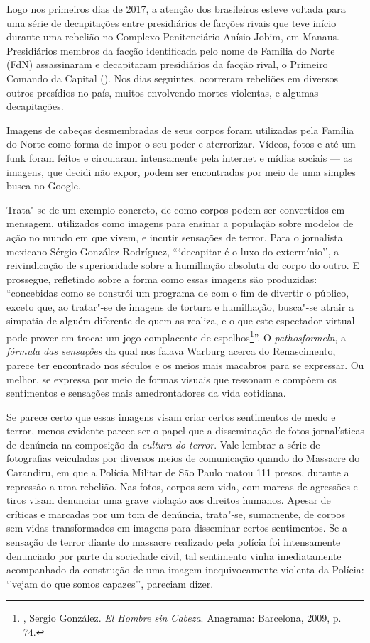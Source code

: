 Logo nos primeiros dias de 2017, a atenção dos brasileiros esteve
voltada para uma série de decapitações entre presidiários de facções
rivais que teve início durante uma rebelião no Complexo Penitenciário
Anísio Jobim, em Manaus. Presidiários membros da facção identificada
pelo nome de Família do Norte (FdN) assassinaram e decapitaram
presidiários da facção rival, o Primeiro Comando da Capital (). Nos
dias seguintes, ocorreram rebeliões em diversos outros presídios no
país, muitos envolvendo mortes violentas, e algumas decapitações.

Imagens de cabeças desmembradas de seus corpos foram utilizadas pela
Família do Norte como forma de impor o seu poder e aterrorizar. Vídeos,
fotos e até um funk foram feitos e circularam intensamente pela internet
e mídias sociais --- as imagens, que decidi não expor, podem ser
encontradas por meio de uma simples busca no Google.

Trata"-se de um exemplo concreto, de como corpos podem ser convertidos em
mensagem, utilizados como imagens para ensinar a população sobre modelos
de ação no mundo em que vivem, e incutir sensações de terror. Para o
jornalista mexicano Sérgio González Rodríguez, ```decapitar é o luxo do
extermínio'', a reivindicação de superioridade sobre a humilhação
absoluta do corpo do outro. E prossegue, refletindo sobre a forma como
essas imagens são produzidas: ``concebidas como se constrói um programa
de  com o fim de divertir o público, exceto que, ao tratar"-se de
imagens de tortura e humilhação, busca"-se atrair a simpatia de alguém
diferente de quem as realiza, e o que este espectador virtual pode
prover em troca: um jogo complacente de espelhos\footnote{,
  Sergio González. \emph{El Hombre sin Cabeza}. Anagrama: Barcelona,
  2009, p. 74.}''. O \emph{pathosformeln}, a \emph{fórmula das
sensações} da qual nos falava Warburg acerca do Renascimento, parece ter
encontrado nos séculos  e  os meios mais macabros para se
expressar. Ou melhor, se expressa por meio de formas visuais que
ressonam e compõem os sentimentos e sensações mais amedrontadores da
vida cotidiana.

Se parece certo que essas imagens visam criar certos sentimentos de medo
e terror, menos evidente parece ser o papel que a disseminação de fotos
jornalísticas de denúncia na composição da \emph{cultura do terror}.
Vale lembrar a série de fotografias veiculadas por diversos meios de
comunicação quando do Massacre do Carandiru, em que a Polícia Militar de
São Paulo matou 111 presos, durante a repressão a uma rebelião. Nas
fotos, corpos sem vida, com marcas de agressões e tiros visam denunciar
uma grave violação aos direitos humanos. Apesar de críticas e marcadas
por um tom de denúncia, trata"-se, sumamente, de corpos sem vidas
transformados em imagens para disseminar certos sentimentos. Se a
sensação de terror diante do massacre realizado pela polícia foi
intensamente denunciado por parte da sociedade civil, tal sentimento
vinha imediatamente acompanhado da construção de uma imagem
inequivocamente violenta da Polícia: `'vejam do que somos capazes'',
pareciam dizer.

